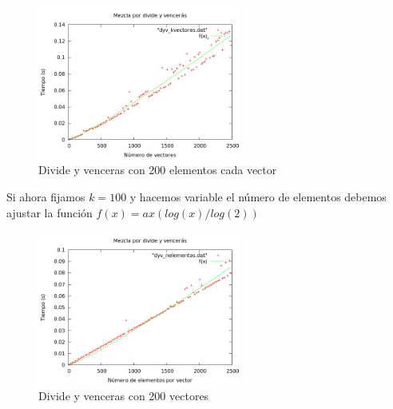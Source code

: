 \begin{center}
\end{center}

\begin{figure}[htb] 
\centering
	\includegraphics[width=0.6\textwidth]{../Obligatorio/Graficas/dyv_kvectores.png}
	\caption{Divide y venceras con 200 elementos cada vector} 
	\label{fig:d_kvectores} 
\end{figure}

Si ahora fijamos $k=100$ y hacemos variable el n\'umero de elementos debemos ajustar la funci\'on $f(x) = ax(log(x)/log(2))$

\begin{center}
\end{center}

\begin{figure}[htb] 
\centering
	\includegraphics[width=0.6\textwidth]{../Obligatorio/Graficas/dyv_nelementos.png}
	\caption{Divide y venceras con 200 vectores} 
	\label{fig:d_nelementos} 
\end{figure}
\newpage

